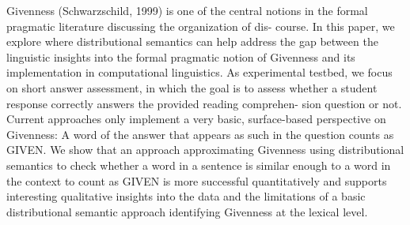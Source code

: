 Givenness (Schwarzschild, 1999) is one of the central notions in the formal pragmatic literature discussing the organization of dis- course. In this paper, we explore where distributional semantics can help address the gap between the linguistic insights into the formal pragmatic notion of Givenness and its implementation in computational linguistics. As experimental testbed, we focus on short answer assessment, in which the goal is to assess whether a student response correctly answers the provided reading comprehen- sion question or not. Current approaches only implement a very basic, surface-based perspective on Givenness: A word of the answer that appears as such in the question counts as GIVEN. We show that an approach approximating Givenness using distributional semantics to check whether a word in a sentence is similar enough to a word in the context to count as GIVEN is more successful quantitatively and supports interesting qualitative insights into the data and the limitations of a basic distributional semantic approach identifying Givenness at the lexical level.
